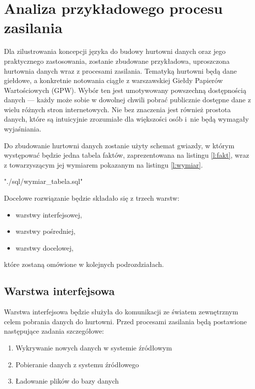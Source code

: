 \section{Analiza przykładowego procesu zasilania}
Dla zilustrowania koncepcji języka do budowy hurtowni danych oraz jego praktycznego zastosowania,
 zostanie zbudowane przykładowa,
 uproszczona hurtownia danych wraz z procesami zasilania. 
Tematyką hurtowni będą dane giełdowe, a konkretnie notowania ciągłe z warszawskiej Giełdy Papierów Wartościowych (GPW).
Wybór ten jest umotywowany powszechną dostępnością danych ---
 każdy może sobie w dowolnej chwili pobrać publicznie dostępne dane z wielu różnych stron internetowych.
Nie bez znaczenia jest również prostota danych, które są intuicyjnie zrozumiałe dla większości osób 
 i~nie będą wymagały wyjaśniania.

Do zbudowanie hurtowni danych zostanie użyty schemat gwiazdy, 
 w którym występować będzie jedna tabela faktów, zaprezentowana na listingu \ref{l:fakt},
 wraz z towarzyszącym jej wymiarem pokazanym na listingu \ref{l:wymiar}.
 
 {"./sql/wymiar_tabela.sql"} 

 
Docelowe rozwiązanie będzie składało się z trzech warstw:
 \begin{itemize}
  \item warstwy interfejsowej,
  \item warstwy pośredniej,
  \item warstwy docelowej,
 \end{itemize}
które zostaną omówione w kolejnych podrozdziałach.

\subsection{Warstwa interfejsowa}

Warstwa interfejsowa będzie służyła do komunikacji ze światem zewnętrznym celem pobrania danych do hurtowni. 
Przed procesami zasilania będą postawione następujące zadania szczegółowe:
\begin{enumerate}
 \item \label{w_intf:wykrywanie}
 Wykrywanie nowych danych w systemie źródłowym
 \item \label{w_inf:pobieranie}
 Pobieranie danych z systemu źródłowego
 \item \label{w_intf_ladowanie}
Ładowanie plików do bazy danych                 
        
\end{enumerate}

